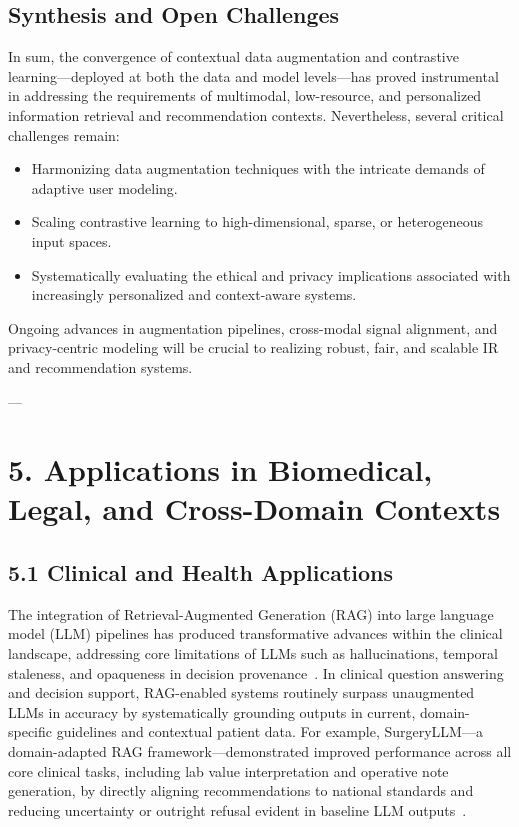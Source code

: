 \documentclass[11pt]{article}
\begin{document}
\subsection{Synthesis and Open Challenges}

In sum, the convergence of contextual data augmentation and contrastive learning—deployed at both the data and model levels—has proved instrumental in addressing the requirements of multimodal, low-resource, and personalized information retrieval and recommendation contexts. Nevertheless, several critical challenges remain:

\begin{itemize}
    \item Harmonizing data augmentation techniques with the intricate demands of adaptive user modeling.
    \item Scaling contrastive learning to high-dimensional, sparse, or heterogeneous input spaces.
    \item Systematically evaluating the ethical and privacy implications associated with increasingly personalized and context-aware systems.
\end{itemize}

Ongoing advances in augmentation pipelines, cross-modal signal alignment, and privacy-centric modeling will be crucial to realizing robust, fair, and scalable IR and recommendation systems.


---

\section{5. Applications in Biomedical, Legal, and Cross-Domain Contexts}

\subsection{5.1 Clinical and Health Applications}

The integration of Retrieval-Augmented Generation (RAG) into large language model (LLM) pipelines has produced transformative advances within the clinical landscape, addressing core limitations of LLMs such as hallucinations, temporal staleness, and opaqueness in decision provenance~\cite{ref1,ref2,ref3,ref5,ref6,ref7,ref8,ref29,ref30,ref31,ref42,ref48,ref52,ref53,ref54,ref55}. In clinical question answering and decision support, RAG-enabled systems routinely surpass unaugmented LLMs in accuracy by systematically grounding outputs in current, domain-specific guidelines and contextual patient data. For example, SurgeryLLM—a domain-adapted RAG framework—demonstrated improved performance across all core clinical tasks, including lab value interpretation and operative note generation, by directly aligning recommendations to national standards and reducing uncertainty or outright refusal evident in baseline LLM outputs~\cite{ref1}.
\end{document}

